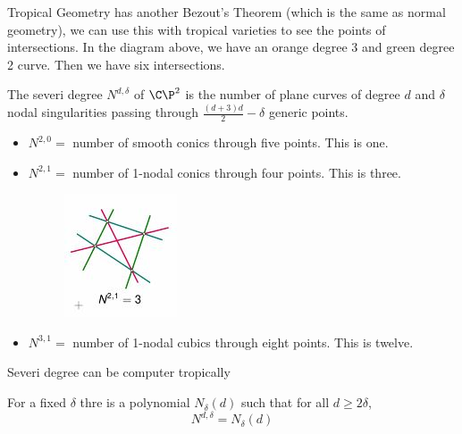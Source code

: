 \documentclass{article}
\begin{document}
Tropical Geometry has another Bezout's Theorem (which is the same as normal geometry), we can use this with tropical varieties to see the points of intersections. In the diagram above, we have an orange degree 3 and green degree 2 curve. Then we have six intersections.


\begin{ndefi}
  The severi degree $N^{d, \delta}$ of $\C\P^2$ is the number of plane curves of degree $d$ and $\delta$ nodal singularities passing through $\frac{(d+3)d}{2}-\delta$ generic points.
\end{ndefi}

\begin{eg}
  \begin{itemize}
    \item $N^{2,0} = $ number of smooth conics through five points. This is one.
    \item $N^{2,1} = $ number of 1-nodal conics through four points. This is three.
    \begin{figure}[!ht]
    \centering
    \includegraphics{./figures/L2.10}
    \end{figure}
    \item  $N^{3,1} = $ number of 1-nodal cubics through eight points. This is twelve.
  \end{itemize}
\end{eg}

\begin{nthm}[Mikhalkin 2005]
  Severi degree can be computer tropically
\end{nthm}

\begin{nthm}
  For a fixed $\delta$ thre is a polynomial $N_\delta (d)$ such that for all $d \ge 2\delta$,
  $$ N^{d,\delta} = N_\delta (d) $$
\end{nthm}
\end{document}
